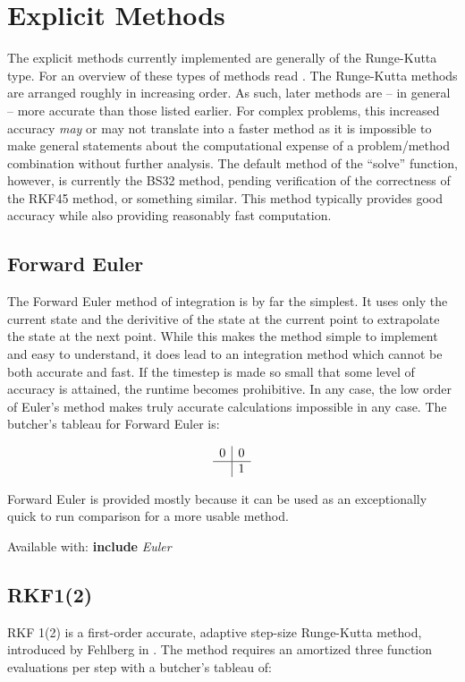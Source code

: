 \documentclass[letterpaper,10pt]{book}
\newcommand{\srcas}[1]{Available with: \textbf{include} \textlangle{}\textit{#1}\textrangle{}}
\begin{document}
      
    \section{Explicit Methods}
      The explicit methods currently implemented are generally of the Runge-Kutta type.  For an overview of these types of methods read \cite{butcher1996history}.  The Runge-Kutta methods are arranged roughly in increasing order.  As such, later methods are -- in general -- more accurate than those listed earlier.  For complex problems, this increased accuracy \textit{may} or may not translate into a faster method as it is impossible to make general statements about the computational expense of a problem/method combination without further analysis.  The default method of the ``solve'' function, however, is currently the BS32 method, pending verification of the correctness of the RKF45 method, or something similar.  This method typically provides good accuracy while also providing reasonably fast computation.
      
      \subsection{Forward Euler}   
	The Forward Euler method of integration is by far the simplest.  It uses only the current state and the derivitive of the state at the current point to extrapolate the state at the next point.  While this makes the method simple to implement and easy to understand, it does lead to an integration method which cannot be both accurate and fast.  If the timestep is made so small that some level of accuracy is attained, the runtime becomes prohibitive.  In any case, the low order of Euler's method makes truly accurate calculations impossible in any case.  The butcher's tableau for Forward Euler is:
	
	\[
	  \begin{array}{c|c}
	    0 & 0\\
	    \hline
	    & 1
	  \end{array}
	\]
	
	Forward Euler is provided mostly because it can be used as an exceptionally quick to run comparison for a more usable method.
	
	\srcas{Euler}
	
      \subsection{RKF1(2)}
	RKF 1(2) is a first-order accurate, adaptive step-size Runge-Kutta method, introduced by Fehlberg in \cite{fehlberg1969low}.  The method requires an amortized three function evaluations per step with a butcher's tableau of:
	
\end{document}
